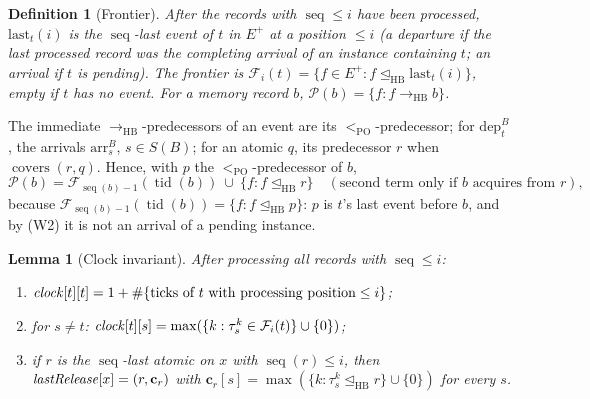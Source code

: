 \documentclass[11pt]{article}
\newtheorem{lemma}[theorem]{Lemma}
\newtheorem{definition}[theorem]{Definition}
\theoremstyle{remark}
\DeclareMathOperator{\tid}{tid}
\DeclareMathOperator{\seq}{seq}
\DeclareMathOperator{\covers}{covers}
\newcommand{\HB}{\to_{\mathrm{HB}}}
\newcommand{\HBr}{\trianglelefteq_{\mathrm{HB}}}
\newcommand{\PO}{<_{\mathrm{PO}}}
\newcommand{\arr}[2]{\mathrm{arr}^{#2}_{#1}}
\newcommand{\dep}[2]{\mathrm{dep}^{#2}_{#1}}
\newcommand{\tick}[2]{\tau^{#2}_{#1}}
\newcommand{\Fr}{\mathcal{F}}
\newcommand{\Eplus}{E^{+}}
\begin{document}
\begin{definition}[Frontier]\label{def:frontier}
After the records with $\seq\le i$ have been processed, $\mathrm{last}_t(i)$
is the $\seq$-last event of $t$ in $\Eplus$ at a position $\le i$
(a departure if the last processed record was the completing arrival of an
instance containing $t$; an arrival if $t$ is pending). The \emph{frontier} is
$\Fr_i(t)=\{f\in\Eplus:f\HBr\mathrm{last}_t(i)\}$, empty if $t$ has no event.
For a memory record $b$, $\mathcal{P}(b)=\{f:f\HB b\}$.
\end{definition}

The immediate $\HB$-predecessors of an event are its $\PO$-predecessor; for
$\dep{t}{B}$, the arrivals $\arr{s}{B}$, $s\in S(B)$; for an atomic $q$, its
predecessor $r$ when $\covers(r,q)$. Hence, with $p$ the $\PO$-predecessor of
$b$,
\begin{equation}\label{eq:pred}
\mathcal{P}(b)=\Fr_{\seq(b)-1}(\tid(b))\ \cup\ \{f:f\HBr r\}
\quad(\text{second term only if $b$ acquires from $r$}),
\end{equation}
because $\Fr_{\seq(b)-1}(\tid(b))=\{f:f\HBr p\}$: $p$ is $t$'s last event
before $b$, and by (W2) it is not an arrival of a pending instance.

\begin{lemma}[Clock invariant]\label{lem:vc}
After processing all records with $\seq\le i$:
\begin{enumerate}
\item[(a)] $\mathit{clock}[t][t]=1+\#\{\text{ticks of }t\text{ with processing position}\le i\}$;
\item[(b)] for $s\ne t$: $\clk[t][s]=\max(\{k:\tick{s}{k}\in\Fr_i(t)\}\cup\{0\})$;
\item[(c)] if $r$ is the $\seq$-last atomic on $x$ with $\seq(r)\le i$, then
      $\mathit{lastRelease}[x]=(r,\mathbf{c}_r)$ with
      $\mathbf{c}_r[s]=\max(\{k:\tick{s}{k}\HBr r\}\cup\{0\})$ for every $s$.
\end{enumerate}
\end{lemma}
\end{document}

